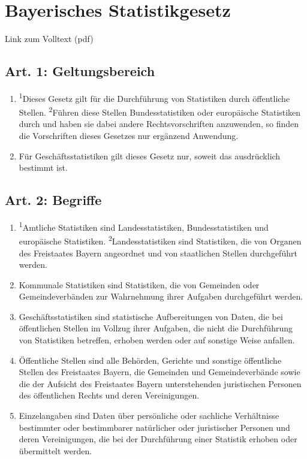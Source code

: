 \documentclass[12pt]{scrbook}
\begin{document}
\chapter[BayStatG]{Bayerisches Statistikgesetz}
Link zum Volltext (pdf)
    \section{Art. 1: Geltungsbereich}
        \begin{enumerate}[label=(\arabic*)]
            \item \textsuperscript{1}Dieses Gesetz gilt für die Durchführung von Statistiken durch öffentliche Stellen. \textsuperscript{2}Führen diese Stellen Bundesstatistiken oder europäische Statistiken durch und haben sie dabei andere Rechtsvorschriften anzuwenden, so finden die Vorschriften dieses Gesetzes nur ergänzend Anwendung.
            \item Für Geschäftsstatistiken gilt dieses Gesetz nur, soweit das ausdrücklich bestimmt ist.
        \end{enumerate}
    \section{Art. 2: Begriffe}
        \begin{enumerate}[label=(\arabic*)]
            \item \textsuperscript{1}Amtliche Statistiken sind Landesstatistiken, Bundesstatistiken und europäische Statistiken. \textsuperscript{2}Landesstatistiken sind Statistiken, die von Organen des Freistaates Bayern angeordnet und von staatlichen Stellen durchgeführt werden.
            \item Kommunale Statistiken sind Statistiken, die von Gemeinden oder Gemeindeverbänden zur Wahrnehmung ihrer Aufgaben durchgeführt werden.
            \item Geschäftsstatistiken sind statistische Aufbereitungen von Daten, die bei öffentlichen Stellen im Vollzug ihrer Aufgaben, die nicht die Durchführung von Statistiken betreffen, erhoben werden oder auf sonstige Weise anfallen.
            \item Öffentliche Stellen sind alle Behörden, Gerichte und sonstige öffentliche Stellen des Freistaates Bayern, die Gemeinden und Gemeindeverbände sowie die der Aufsicht des Freistaates Bayern unterstehenden juristischen Personen des öffentlichen Rechts und deren Vereinigungen.
            \item Einzelangaben sind Daten über persönliche oder sachliche Verhältnisse bestimmter oder bestimmbarer natürlicher oder juristischer Personen und deren Vereinigungen, die bei der Durchführung einer Statistik erhoben oder übermittelt werden.
        \end{enumerate}
\end{document}
